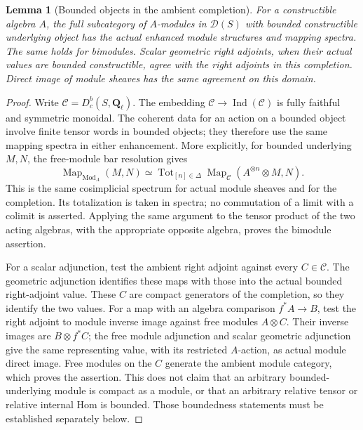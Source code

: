 \documentclass[11pt]{article}
\newtheorem{lemma}[proposition]{Lemma}
\theoremstyle{definition}
\theoremstyle{remark}
\newcommand{\Q}{\mathbf Q_\ell}
\begin{document}
\begin{lemma}[Bounded objects in the ambient completion]
\label{lem:bounded-ambient}
For a constructible algebra $A$, the full subcategory of
$A$-modules in $\mathscr D(S)$ with bounded constructible underlying
object has the actual enhanced module structures and mapping spectra.
The same holds for bimodules.  Scalar geometric right adjoints, when
their actual values are bounded constructible, agree with the right
adjoints in this completion.  Direct image of module sheaves has the
same agreement on this domain.
\end{lemma}
\begin{proof}
Write $\mathcal C=D_c^b(S,\Q)$.  The embedding
$\mathcal C\to\operatorname{Ind}(\mathcal C)$ is fully faithful and
symmetric monoidal.  The coherent data for an action on a bounded
object involve finite tensor words in bounded objects; they therefore
use the same mapping spectra in either enhancement.  More explicitly,
for bounded underlying $M,N$, the free-module bar resolution gives
\[
 \operatorname{Map}_{\operatorname{Mod}_A}(M,N)
 \simeq\operatorname{Tot}_{[n]\in\Delta}
     \operatorname{Map}_{\mathcal C}(A^{\otimes n}\otimes M,N).
\]
This is the same cosimplicial spectrum for actual module sheaves and
for the completion.  Its totalization is taken in spectra; no
commutation of a limit with a colimit is asserted.  Applying the same
argument to the tensor product of the two acting algebras, with the
appropriate opposite algebra, proves the bimodule assertion.

For a scalar adjunction, test the ambient right adjoint against every
$C\in\mathcal C$.  The geometric adjunction identifies these maps
with those into the actual bounded right-adjoint value.  These $C$
are compact generators of the completion, so they identify the two
values.  For a map with an algebra comparison $f^*A\to B$, test the
right adjoint to module inverse image against free modules
$A\otimes C$.  Their inverse images are $B\otimes f^*C$; the free
module adjunction and scalar geometric adjunction give the same
representing value, with its restricted $A$-action, as actual module
direct image.  Free modules on the $C$ generate the ambient module
category, which proves the assertion.  This does not claim that an
arbitrary bounded-underlying module is compact as a module, or that
an arbitrary relative tensor or relative internal Hom is bounded.
Those boundedness statements must be established separately below.
\end{proof}
\end{document}
